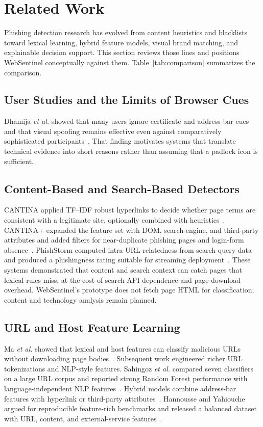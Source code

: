 \documentclass[conference]{IEEEtran}
\begin{document}
\section{Related Work}
\label{sec:related}
Phishing detection research has evolved from content heuristics and blacklists toward lexical learning, hybrid feature models, visual brand matching, and explainable decision support. This section reviews those lines and positions WebSentinel conceptually against them. Table~\ref{tab:comparison} summarizes the comparison.

\subsection{User Studies and the Limits of Browser Cues}
Dhamija \emph{et al.} showed that many users ignore certificate and address-bar cues and that visual spoofing remains effective even against comparatively sophisticated participants~\cite{dhamija2006why}. That finding motivates systems that translate technical evidence into short reasons rather than assuming that a padlock icon is sufficient.

\subsection{Content-Based and Search-Based Detectors}
CANTINA applied TF--IDF robust hyperlinks to decide whether page terms are consistent with a legitimate site, optionally combined with heuristics~\cite{zhang2007cantina}. CANTINA+ expanded the feature set with DOM, search-engine, and third-party attributes and added filters for near-duplicate phishing pages and login-form absence~\cite{xiang2011cantinaplus}. PhishStorm computed intra-URL relatedness from search-query data and produced a phishingness rating suitable for streaming deployment~\cite{marchal2014phishstorm}. These systems demonstrated that content and search context can catch pages that lexical rules miss, at the cost of search-API dependence and page-download overhead. WebSentinel's prototype does not fetch page HTML for classification; content and technology analysis remain planned.

\subsection{URL and Host Feature Learning}
Ma \emph{et al.} showed that lexical and host features can classify malicious URLs without downloading page bodies~\cite{ma2009beyond}. Subsequent work engineered richer URL tokenizations and NLP-style features. Sahingoz \emph{et al.} compared seven classifiers on a large URL corpus and reported strong Random Forest performance with language-independent NLP features~\cite{sahingoz2019ml}. Hybrid models combine address-bar features with hyperlink or third-party attributes~\cite{rao2019detection}. Hannousse and Yahiouche argued for reproducible feature-rich benchmarks and released a balanced dataset with URL, content, and external-service features~\cite{hannousse2021benchmark}.
\end{document}
